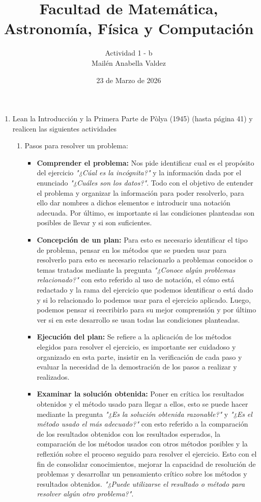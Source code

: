 \documentclass[a4paper]{article}
\title{Facultad de Matemática, Astronomía, Física y Computación}
\author{Actividad 1 - b\\ Mailén Anabella Valdez}
\date{23 de Marzo de 2026}
\begin{document}
\maketitle
\begin{enumerate}
    \item Lean la Introducción y la Primera Parte de Pòlya (1945) (hasta página 41) y realicen las siguientes actividades
        \begin{enumerate}
            \item Pasos para resolver un problema:
            \begin{itemize}
                \item \textbf{Comprender el problema:} Nos pide identificar cual es el propósito del ejercicio \textit{"¿Cúal es la incógnita?"} y la información dada por el enunciado \textit{"¿Cuáles son los datos?"}. Todo con el objetivo de entender el problema y organizar la información para poder resolverlo, para ello dar nombres a dichos elementos e introducir una notación adecuada. Por último, es importante si las condiciones planteadas son posibles de llevar y si son suficientes.
                \item \textbf{Concepción de un plan:} Para esto es necesario identificar el tipo de problema, pensar en los métodos que se pueden usar para resolverlo para esto es necesario relacionarlo a problemas conocidos o temas tratados mediante la pregunta \textit{"¿Conoce algún problemas relacionado?"} con esto referido al uso de notación, el cómo está redactado y la rama del ejercicio que podemos identificar o está dado y si lo relacionado lo podemos usar para el ejercicio aplicado. Luego, podemos pensar si reecribirlo para su mejor comprensión y por último ver si en este desarrollo se usan todas las condiciones planteadas.
                \item \textbf{Ejecución del plan:} Se refiere a la aplicación de los métodos elegidos para resolver el ejercicio, es importante ser cuidadoso y organizado en esta parte, insistir en la verificación de cada paso y evaluar la necesidad de la demostración de los pasos a realizar y realizados.
                \item \textbf{Examinar la solución obtenida:} Poner en crítica los resultados obtenidos y el método usado para llegar a ellos, esto se puede hacer mediante la pregunta \textit{"¿Es la solución obtenida razonable?"} y \textit{"¿Es el método usado el más adecuado?"} con esto referido a la comparación de los resultados obtenidos con los resultados esperados, la comparación de los métodos usados con otros métodos posibles y la reflexión sobre el proceso seguido para resolver el ejercicio. Esto con el fin de consolidar conocimientos, mejorar la capacidad de resolución de problemas y desarrollar un pensamiento crítico sobre los métodos y resultados obtenidos. \textit{"¿Puede utilizarse el resultado o método para resolver algún otro problema?"}.

\end{itemize}
\end{enumerate}
\end{enumerate}
\end{document}
